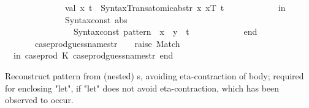 \begin{isabellebody}
\ \ \ \ \ \ \ \ \ \ \ \ \ \ val\ {\isacharparenleft}{\kern0pt}x{\isacharprime}{\kern0pt}{\isacharcomma}{\kern0pt}\ t{\isacharprime}{\kern0pt}{\isacharprime}{\kern0pt}{\isacharparenright}{\kern0pt}\ {\isacharequal}{\kern0pt}\ Syntax{\isacharunderscore}{\kern0pt}Trans{\isachardot}{\kern0pt}atomic{\isacharunderscore}{\kern0pt}abs{\isacharunderscore}{\kern0pt}tr{\isacharprime}{\kern0pt}\ {\isacharparenleft}{\kern0pt}{\isachardoublequote}{\kern0pt}x{\isachardoublequote}{\kern0pt}{\isacharcomma}{\kern0pt}\ xT{\isacharcomma}{\kern0pt}\ t{\isacharprime}{\kern0pt}{\isacharparenright}{\kern0pt}{\isacharsemicolon}{\kern0pt}\isanewline
\ \ \ \ \ \ \ \ \ \ \ \ in\isanewline
\ \ \ \ \ \ \ \ \ \ \ \ \ \ Syntax{\isachardot}{\kern0pt}const\ \isactrlsyntaxUNDERSCOREconst {\isasymopen}{\isacharunderscore}{\kern0pt}abs{\isasymclose}\ {\isachardollar}{\kern0pt}\isanewline
\ \ \ \ \ \ \ \ \ \ \ \ \ \ \ \ {\isacharparenleft}{\kern0pt}Syntax{\isachardot}{\kern0pt}const\ \isactrlsyntaxUNDERSCOREconst {\isasymopen}{\isacharunderscore}{\kern0pt}pattern{\isasymclose}\ {\isachardollar}{\kern0pt}\ x{\isacharprime}{\kern0pt}\ {\isachardollar}{\kern0pt}\ y{\isacharparenright}{\kern0pt}\ {\isachardollar}{\kern0pt}\ t{\isacharprime}{\kern0pt}{\isacharprime}{\kern0pt}\isanewline
\ \ \ \ \ \ \ \ \ \ \ \ end{\isacharparenright}{\kern0pt}\isanewline
\ \ \ \ \ \ {\isacharbar}{\kern0pt}\ case{\isacharunderscore}{\kern0pt}prod{\isacharunderscore}{\kern0pt}guess{\isacharunderscore}{\kern0pt}names{\isacharunderscore}{\kern0pt}tr{\isacharprime}{\kern0pt}\ {\isacharunderscore}{\kern0pt}\ {\isacharunderscore}{\kern0pt}\ {\isacharequal}{\kern0pt}\ raise\ Match{\isacharsemicolon}{\kern0pt}\isanewline
\ \ in\ {\isacharbrackleft}{\kern0pt}{\isacharparenleft}{\kern0pt}\isactrlconstUNDERSCOREsyntax {\isasymopen}case{\isacharunderscore}{\kern0pt}prod{\isasymclose}{\isacharcomma}{\kern0pt}\ K\ case{\isacharunderscore}{\kern0pt}prod{\isacharunderscore}{\kern0pt}guess{\isacharunderscore}{\kern0pt}names{\isacharunderscore}{\kern0pt}tr{\isacharprime}{\kern0pt}{\isacharparenright}{\kern0pt}{\isacharbrackright}{\kern0pt}\ end\isanewline
{\isacartoucheclose}%
\endisatagML
{\isafoldML}%
%
\isadelimML
%
\endisadelimML
%
\begin{isamarkuptext}%
Reconstruct pattern from (nested) s,
  avoiding eta-contraction of body; required for enclosing "let",
  if "let" does not avoid eta-contraction, which has been observed to occur.%
\end{isamarkuptext}\isamarkuptrue%
%
\isadelimML
%
\endisadelimML
%
\isatagML

\end{isabellebody}
